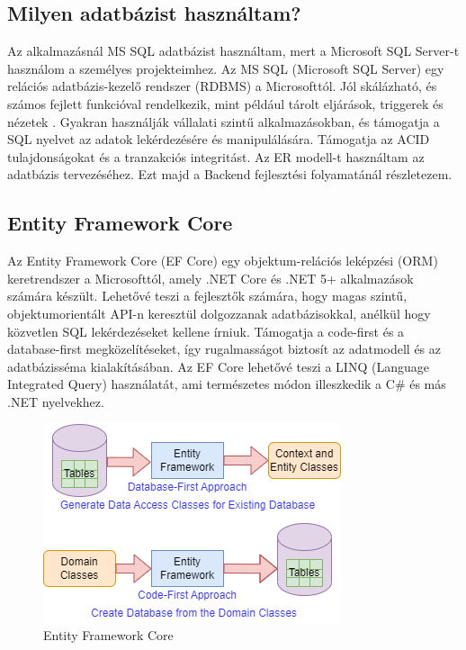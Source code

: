 \subsection*{Milyen adatbázist használtam?}
Az alkalmazásnál MS SQL adatbázist használtam, mert a Microsoft SQL Server-t használom a személyes projekteimhez.
Az MS SQL (Microsoft SQL Server) egy relációs adatbázis-kezelő rendszer (RDBMS) a Microsofttól. Jól skálázható, és számos fejlett funkcióval rendelkezik,
mint például tárolt eljárások,
triggerek és nézetek
. Gyakran használják vállalati szintű alkalmazásokban,
és támogatja a SQL nyelvet az adatok lekérdezésére és manipulálására.
Támogatja az ACID tulajdonságokat és a tranzakciós integritást.
Az ER modell-t használtam az adatbázis tervezéséhez.
Ezt majd a Backend fejlesztési folyamatánál részletezem.

\subsection*{Entity Framework Core}
Az Entity Framework Core (EF Core) egy objektum-relációs leképzési (ORM) keretrendszer a Microsofttól,
amely .NET Core és .NET 5+ alkalmazások számára készült.
Lehetővé teszi a fejlesztők számára, hogy magas szintű,
objektumorientált API-n keresztül dolgozzanak adatbázisokkal,
anélkül hogy közvetlen SQL lekérdezéseket kellene írniuk.
Támogatja a code-first és a database-first megközelítéseket,
így rugalmasságot biztosít az adatmodell és az adatbázisséma kialakításában. Az EF Core lehetővé teszi a LINQ (Language Integrated Query) használatát,
ami természetes módon illeszkedik a C\# és más .NET nyelvekhez.

\begin{figure}[H]
    \centering
    \includegraphics[width=10.0truecm]{images/EntityFramework.png}
    \caption{Entity Framework Core}
    \label{fig:entity_framework_core}
\end{figure}

